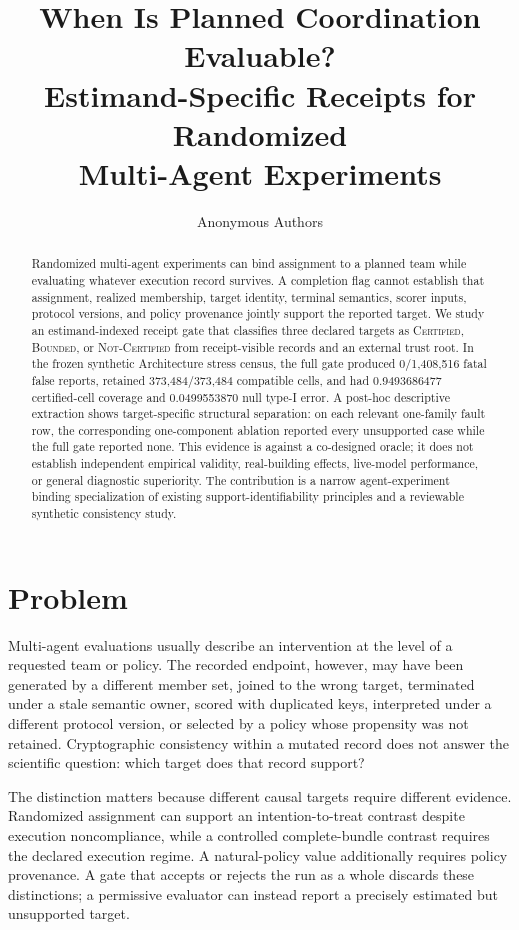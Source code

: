 \documentclass{article}
\title{When Is Planned Coordination Evaluable?\\
Estimand-Specific Receipts for Randomized\\
Multi-Agent Experiments}
\author{Anonymous Authors}
\newcommand{\cert}{\textsc{Certified}\xspace}
\newcommand{\bounded}{\textsc{Bounded}\xspace}
\newcommand{\notcert}{\textsc{Not-Certified}\xspace}
\begin{document}
\maketitle

\begin{abstract}
Randomized multi-agent experiments can bind assignment to a planned team while evaluating whatever execution record survives. A completion flag cannot establish that assignment, realized membership, target identity, terminal semantics, scorer inputs, protocol versions, and policy provenance jointly support the reported target. We study an estimand-indexed receipt gate that classifies three declared targets as \cert, \bounded, or \notcert from receipt-visible records and an external trust root. In the frozen synthetic Architecture stress census, the full gate produced 0/1,408,516 fatal false reports, retained 373,484/373,484 compatible cells, and had 0.9493686477 certified-cell coverage and 0.0499553870 null type-I error. A post-hoc descriptive extraction shows target-specific structural separation: on each relevant one-family fault row, the corresponding one-component ablation reported every unsupported case while the full gate reported none. This evidence is against a co-designed oracle; it does not establish independent empirical validity, real-building effects, live-model performance, or general diagnostic superiority. The contribution is a narrow agent-experiment binding specialization of existing support-identifiability principles and a reviewable synthetic consistency study.
\end{abstract}

\section{Problem}
\label{sec:problem}

Multi-agent evaluations usually describe an intervention at the level of a requested team or policy. The recorded endpoint, however, may have been generated by a different member set, joined to the wrong target, terminated under a stale semantic owner, scored with duplicated keys, interpreted under a different protocol version, or selected by a policy whose propensity was not retained. Cryptographic consistency within a mutated record does not answer the scientific question: which target does that record support?

The distinction matters because different causal targets require different evidence. Randomized assignment can support an intention-to-treat contrast despite execution noncompliance, while a controlled complete-bundle contrast requires the declared execution regime. A natural-policy value additionally requires policy provenance. A gate that accepts or rejects the run as a whole discards these distinctions; a permissive evaluator can instead report a precisely estimated but unsupported target.
\end{document}

